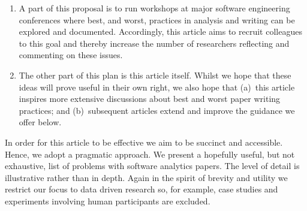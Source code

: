 \documentclass[preprint,10pt]{elsarticle}
\begin{document}
\begin{enumerate}
    \item A part of this proposal is to run workshops at major software engineering conferences where best, and worst, practices in analysis and writing can be explored and documented.
Accordingly, this article aims to recruit colleagues to this goal and thereby increase the number of  researchers reflecting and commenting on these issues.
\item The other part of this plan is this article itself.  Whilst we hope that these ideas will prove useful in their own right, we also hope that (a)~this article inspires more extensive discussions about best and worst paper writing practices; and (b)~subsequent articles extend and improve the guidance we offer below.
\end{enumerate}

In order for this article to be effective we aim to be succinct and accessible. Hence, we adopt a  pragmatic approach.  We present a hopefully useful, but not exhaustive, list of problems with software analytics papers. The level of detail is illustrative rather than in depth.  Again in the spirit of brevity and utility we restrict our focus to data driven research so, for example, case studies and experiments involving human participants are excluded.
\end{document}
